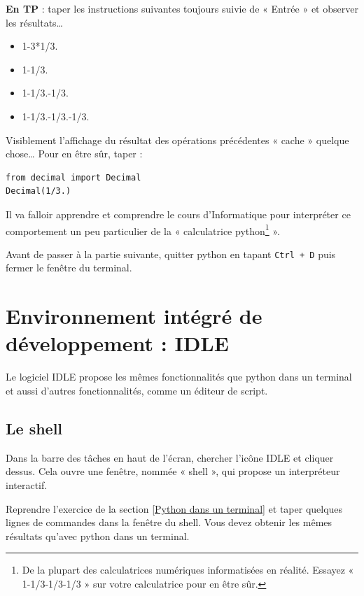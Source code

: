 \textbf{En TP} : taper les instructions suivantes toujours suivie de « Entrée » et observer les résultats\dots

\ttfamily

\begin{itemize}
 \item[] 1-3*1/3.
 \item[] 1-1/3.
 \item[] 1-1/3.-1/3.
 \item[] 1-1/3.-1/3.-1/3.
\end{itemize}

\rmfamily

Visiblement l'affichage du résultat des opérations précédentes « cache » quelque chose{\dots} Pour en être sûr, taper :

\begin{verbatim}
from decimal import Decimal
Decimal(1/3.)
\end{verbatim}

Il va falloir apprendre et comprendre le cours d'Informatique pour interpréter ce comportement un peu particulier de la « calculatrice python\footnote{De la plupart des calculatrices numériques informatisées en réalité. Essayez « 1-1/3-1/3-1/3 » sur votre calculatrice pour en être sûr.} ».

Avant de passer à la partie suivante, quitter python en tapant \texttt{Ctrl + D} puis fermer le fenêtre du terminal.

\section{Environnement intégré de développement : IDLE}

Le logiciel IDLE propose les mêmes fonctionnalités que python dans un terminal et aussi d'autres fonctionnalités, comme un éditeur de script.

\subsection{Le shell}

Dans la barre des tâches en haut de l'écran, chercher l'icône IDLE et cliquer dessus. Cela ouvre une fenêtre, nommée « shell », qui propose un interpréteur interactif.

\begin{exercice}[Shell]

Reprendre l'exercice de la section \ref{Python dans un terminal} et taper quelques lignes de commandes dans la fenêtre du shell. Vous devez obtenir les m\^ emes r\' esultats qu'avec python dans un terminal.
\end{exercice}

